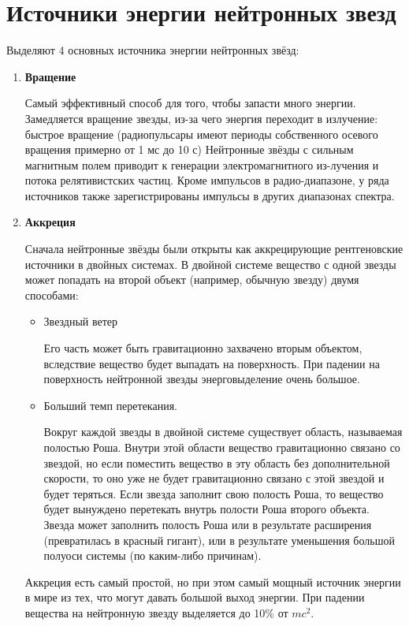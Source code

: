 \section{Источники энергии нейтронных звезд}

Выделяют 4 основных источника энергии нейтронных звёзд:

\begin{enumerate}
	\item \textbf{Вращение}
	
	Самый эффективный способ для того, чтобы запасти много энергии. Замедляется вращение звезды, из-за чего энергия переходит в излучение: быстрое вращение (радиопульсары имеют периоды собственного осевого вращения примерно от 1 мс до 10 с) Нейтронные звёзды с сильным магнитным полем приводит к генерации электромагнитного из-лучения и потока релятивистских частиц. Кроме импульсов в радио-диапазоне, у ряда источников также зарегистрированы импульсы в других диапазонах спектра.
	
	\item \textbf{Аккреция}
	
	Сначала нейтронные звёзды были открыты как аккрецирующие рентгеновские источники в двойных системах. В двойной системе вещество с одной звезды может попадать на второй объект (например, обычную звезду) двумя способами:
	
	\begin{itemize}
		\item Звездный ветер
		
		Его часть может быть гравитационно захвачено вторым объектом, вследствие вещество будет выпадать на поверхность. При падении на поверхность нейтронной звезды энерговыделение очень большое.
		
		\item Больший темп перетекания.
		
		Вокруг каждой звезды в двойной системе существует область, называемая полостью Роша. Внутри этой области вещество гравитационно связано со звездой, но если поместить вещество в эту область без дополнительной скорости, то оно уже не будет гравитационно связано с этой звездой и будет теряться. Если звезда заполнит свою полость Роша, то вещество будет вынуждено перетекать внутрь полости Роша второго объекта. Звезда может заполнить полость Роша или в результате расширения (превратилась в красный гигант), или в результате уменьшения большой полуоси системы (по каким-либо причинам). 
	\end{itemize}

	Аккреция есть самый простой, но при этом самый мощный источник энергии в мире из тех, что могут давать большой выход энергии. При падении вещества на нейтронную звезду выделяется до 10\% от $mc^2$.
	

\end{enumerate}
